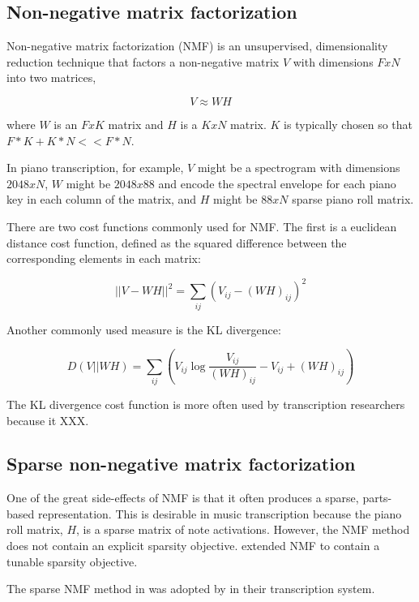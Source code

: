 \documentclass[5p]{elsarticle}
\begin{document}
\subsection{Non-negative matrix factorization}

Non-negative matrix factorization (NMF) is an unsupervised, dimensionality reduction technique that factors a non-negative matrix $V$ with dimensions $FxN$ into two matrices,

\[ V \approx WH \]

\noindent where $W$ is an $FxK$ matrix and $H$ is a $KxN$ matrix. $K$ is typically chosen so that $F*K + K*N << F*N$. 

In piano transcription, for example, $V$ might be a spectrogram with dimensions $2048xN$, $W$ might be $2048x88$ and encode the spectral envelope for each piano key in each column of the matrix, and $H$ might be $88xN$ sparse piano roll matrix. 

There are two cost functions commonly used for NMF. The first is a euclidean distance cost function, defined as the squared difference between the corresponding elements in each matrix:

\[ \displaystyle ||V-WH||^{2} = \sum_{ij} (V_{ij} - (WH)_{ij})^{2} \]

\noindent Another commonly used measure is the KL divergence:

\[ \displaystyle D(V||WH) = \sum_{ij} (V_{ij} \log \frac{V_{ij}}{(WH)_{ij}} - V_{ij} + (WH)_{ij}) \]

The KL divergence cost function is more often used by transcription researchers because it XXX. 

\citet{lee1999learning}
\citet{seung2001algorithms}


\subsection{Sparse non-negative matrix factorization}

One of the great side-effects of NMF is that it often produces a sparse, parts-based representation. This is desirable in music transcription because the piano roll matrix, $H$, is a sparse matrix of note activations. However, the NMF method does not contain an explicit sparsity objective. \citet{hoyer2004non} extended NMF to contain a tunable sparsity objective.

The sparse NMF method in \citet{hoyer2004non} was adopted by \citet{abdallah2004polyphonic} in their transcription system.
\end{document}

